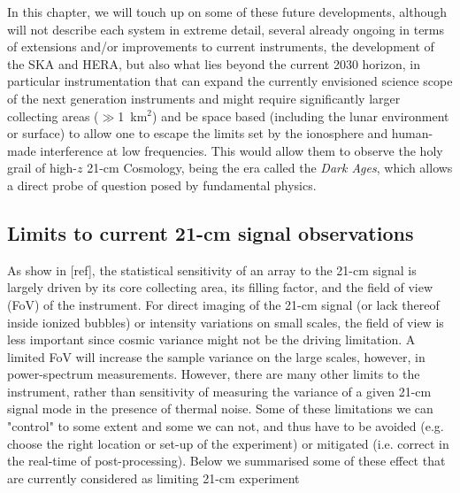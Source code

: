 In this chapter, we will touch up on some of these future developments, although will not describe each system in extreme detail, several already ongoing in terms of extensions and/or improvements to current instruments, the development of the SKA and HERA, but also what lies beyond the current 2030 horizon, in particular instrumentation that can expand the currently envisioned science scope of the next generation instruments and might require significantly larger collecting areas ($\gg$1~km$^2$) and be space based (including the lunar environment or surface) to allow one to escape the limits set by the ionosphere and human-made interference at low frequencies. This would allow them to observe the holy grail of high-$z$ 21-cm Cosmology, being the era called the {\sl Dark Ages}, which allows a direct probe of question posed by fundamental physics. 

\subsection{Limits to current 21-cm signal observations}

As show in [ref], the statistical sensitivity of an array to the 21-cm signal is largely driven by its core collecting area, its filling factor, and the field of view (FoV) of the instrument. For direct imaging of the 21-cm signal (or lack thereof inside ionized bubbles) or intensity variations on small scales, the field of view is less important since cosmic variance might not be the driving limitation. A limited FoV will increase the sample variance on the large scales, however, in power-spectrum measurements. However, there are many other limits to the instrument, rather than sensitivity of measuring the variance of a given 21-cm signal mode in the presence of thermal noise. Some of these limitations we can "control" to some extent and some we can not, and thus have to be avoided (e.g. choose the right location or set-up of the experiment) or mitigated (i.e. correct in the real-time of post-processing).
%
Below we summarised some of these effect that are currently considered as limiting 21-cm experiment

